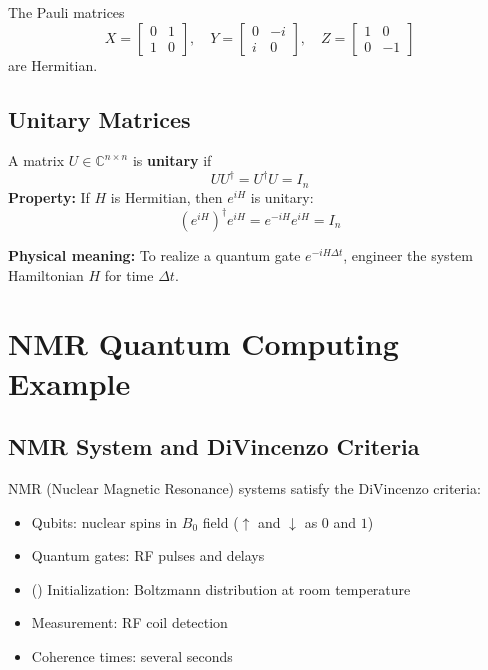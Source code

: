 \documentclass{book}
\begin{document}
The Pauli matrices
\[
X = \begin{bmatrix} 0 & 1 \\ 1 & 0 \end{bmatrix},\quad
Y = \begin{bmatrix} 0 & -i \\ i & 0 \end{bmatrix},\quad
Z = \begin{bmatrix} 1 & 0 \\ 0 & -1 \end{bmatrix}
\]
are Hermitian.

\subsection*{Unitary Matrices}
A matrix $U \in \mathbb{C}^{n \times n}$ is \textbf{unitary} if
\[
U U^\dagger = U^\dagger U = I_n
\]
\textbf{Property:} If $H$ is Hermitian, then $e^{iH}$ is unitary:
\[
(e^{iH})^\dagger e^{iH} = e^{-iH} e^{iH} = I_n
\]

\textbf{Physical meaning:} To realize a quantum gate $e^{-iH\Delta t}$, engineer the system Hamiltonian $H$ for time $\Delta t$.

\section{NMR Quantum Computing Example}

\subsection*{NMR System and DiVincenzo Criteria}
NMR (Nuclear Magnetic Resonance) systems satisfy the DiVincenzo criteria:
\begin{itemize}
    \item \checkmark Qubits: nuclear spins in $B_0$ field ($\uparrow$ and $\downarrow$ as $0$ and $1$)
    \item \checkmark Quantum gates: RF pulses and delays
    \item (\checkmark) Initialization: Boltzmann distribution at room temperature
    \item \checkmark Measurement: RF coil detection
    \item \checkmark Coherence times: several seconds
\end{itemize}

\end{document}

